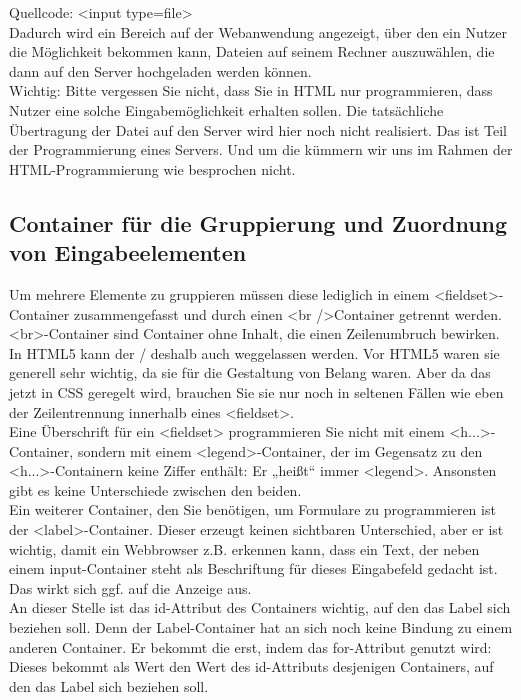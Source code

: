 Quellcode: <input type=file>\\

Dadurch wird ein Bereich auf der Webanwendung angezeigt, über den ein Nutzer die Möglichkeit bekommen kann, Dateien auf seinem Rechner auszuwählen, die dann auf den Server hochgeladen werden können.\\

Wichtig: Bitte vergessen Sie nicht, dass Sie in HTML nur programmieren, dass Nutzer eine solche Eingabemöglichkeit erhalten sollen. Die tatsächliche Übertragung der Datei auf den Server wird hier noch nicht realisiert. Das ist Teil der Programmierung eines Servers. Und um die kümmern wir uns im Rahmen der HTML-Programmierung wie besprochen nicht.

\subsection{Container für die Gruppierung und Zuordnung von Eingabeelementen}

Um mehrere Elemente zu gruppieren müssen diese lediglich in einem <fieldset>-Container zusammengefasst und durch einen <br />Container getrennt werden. <br>-Container sind Container ohne Inhalt, die einen Zeilenumbruch bewirken. In HTML5 kann der / deshalb auch weggelassen werden. Vor HTML5 waren sie generell sehr wichtig, da sie für die Gestaltung von Belang waren. Aber da das jetzt in CSS geregelt wird, brauchen Sie sie nur noch in seltenen Fällen wie eben der Zeilentrennung innerhalb eines <fieldset>.\\

Eine Überschrift für ein <fieldset> programmieren Sie nicht mit einem <h...>-Container, sondern mit einem <legend>-Container, der im Gegensatz zu den <h...>-Containern keine Ziffer enthält: Er „heißt“ immer <legend>. Ansonsten gibt es keine Unterschiede zwischen den beiden.\\

Ein weiterer Container, den Sie benötigen, um Formulare zu programmieren ist der <label>-Container. Dieser erzeugt keinen sichtbaren Unterschied, aber er ist wichtig, damit ein Webbrowser z.B. erkennen kann, dass ein Text, der neben einem input-Container steht als Beschriftung für dieses Eingabefeld gedacht ist. Das wirkt sich ggf. auf die Anzeige aus.\\

An dieser Stelle ist das id-Attribut des Containers wichtig, auf den das Label sich beziehen soll. Denn der Label-Container hat an sich noch keine Bindung zu einem anderen Container. Er bekommt die erst, indem das for-Attribut genutzt wird: Dieses bekommt als Wert den Wert des id-Attributs desjenigen Containers, auf den das Label sich beziehen soll.\\


